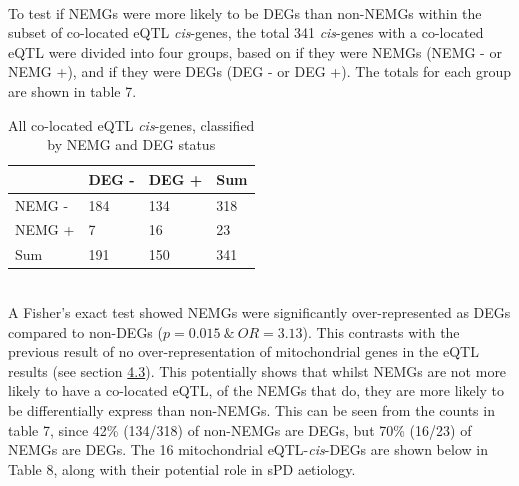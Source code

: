 \documentclass{article}
\begin{document}
\\To test if NEMGs were more likely to be DEGs than non-NEMGs within the subset of co-located eQTL \textit{cis}-genes, the total 341 \textit{cis}-genes with a co-located eQTL were divided into four groups, based on if they were NEMGs (NEMG - or NEMG +), and if they were DEGs (DEG - or DEG +). The totals for each group are shown in table 7.
\begin{table}[h]
    \centering
    \caption{All co-located eQTL \textit{cis}-genes, classified by NEMG and DEG status}
    \begin{tabular}{|l|l|l|l|}
        \hline
                        & DEG - & DEG + & Sum \\ \hline
        NEMG - &  184   & 134   & 318  \\ \hline
        NEMG + &  7  & 16   & 23 \\ \hline
        Sum             & 191   & 150   & 341 \\ \hline
    \end{tabular}
\end{table}
\\A Fisher's exact test showed NEMGs were significantly over-represented as DEGs compared to non-DEGs ($p = 0.015\ \&\ OR = 3.13$). This contrasts with the previous result of no over-representation of mitochondrial genes in the eQTL results (see section \hyperref[fisher1]{4.3}). This potentially shows that whilst NEMGs are not more likely to have a co-located eQTL, of the NEMGs that do, they are more likely to be differentially express than non-NEMGs. This can be seen from the counts in table 7, since 42\% (134/318) of non-NEMGs are DEGs, but 70\% (16/23) of NEMGs are DEGs. The 16 mitochondrial eQTL-\textit{cis}-DEGs are shown below in Table 8, along with their potential role in sPD aetiology.
\end{document}

